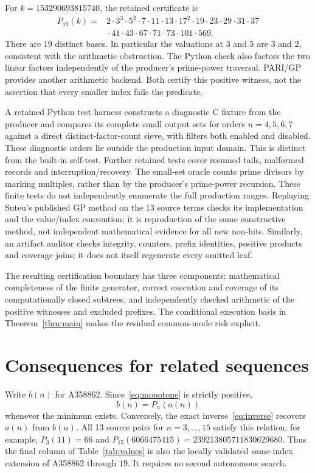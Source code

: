 \documentclass[11pt]{article}
\theoremstyle{remark}
\begin{document}
For $k=153290693815740$, the retained certificate is
\begin{equation}\label{eq:factor19}
\begin{aligned}
 P_{19}(k)={}&2\cdot3^3\cdot5^2\cdot7\cdot11\cdot13\cdot17^2\cdot19
                 \cdot23\cdot29\cdot31\cdot37\\
             &{}\cdot41\cdot43\cdot67\cdot71\cdot73\cdot101\cdot569.
\end{aligned}
\end{equation}
There are $19$ distinct bases. In particular the valuations at $3$ and $5$
are $3$ and $2$, consistent with the arithmetic obstruction. The Python
check also factors the two linear factors independently of the producer's
prime-power traversal. PARI/GP provides another arithmetic backend. Both
certify this positive witness, not the assertion that every smaller index
fails the predicate.

A retained Python test harness constructs a diagnostic C fixture from the
producer and compares its complete small output sets for orders $n=4,5,6,7$
against a direct distinct-factor-count sieve, with filters both enabled and
disabled. These diagnostic orders lie outside the production input domain. This
is distinct from the built-in self-test. Further retained tests cover
resumed tails, malformed records and interruption/recovery. The small-set oracle counts
prime divisors by marking multiples, rather than by the producer's
prime-power recursion. These finite tests do not independently enumerate
the full production ranges. Replaying Suteu's published GP method on the
13 source terms checks its implementation and the value/index convention;
it is reproduction of the same constructive method, not independent
mathematical evidence for all new non-hits. Similarly, an artifact auditor
checks integrity, counters, prefix identities, positive products and
coverage joins; it does not itself regenerate every omitted leaf.

The resulting certification boundary has three components: mathematical
completeness of the finite generator, correct execution and coverage of its
computationally closed subtrees, and independently checked arithmetic of
the positive witnesses and excluded prefixes. The conditional execution
basis in Theorem~\ref{thm:main} makes the residual common-mode risk explicit.

\section{Consequences for related sequences}\label{sec:related}
Write $b(n)$ for A358862. Since~\eqref{eq:monotone} is strictly positive,
\begin{equation}\label{eq:relation}
 b(n)=P_n(a(n))
\end{equation}
whenever the minimum exists. Conversely, the exact inverse~\eqref{eq:inverse}
recovers $a(n)$ from $b(n)$. All 13 source pairs for $n=3,\ldots,15$
satisfy this relation; for example, $P_3(11)=66$ and
$P_{15}(6066475415)=239213805711830629680$. Thus the final column of
Table~\ref{tab:values} is also the locally validated same-index extension
of A358862 through $19$. It requires no second autonomous search.
\end{document}
